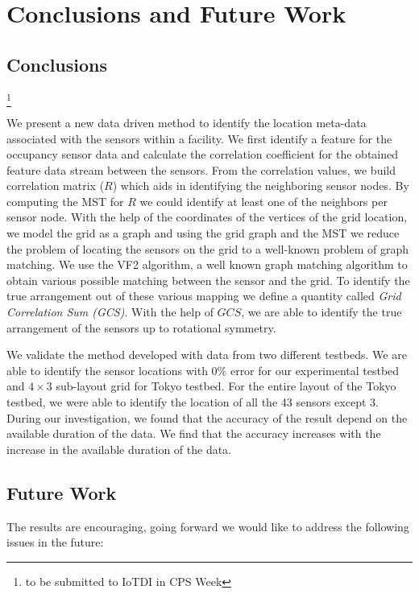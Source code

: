 \chapter{Conclusions and Future Work}
\label{chp:conclusionsandfuturework}
\newcommand\blfootnote[1]{%
  \begingroup
  \renewcommand\thefootnote{}\footnote{#1}%
  \addtocounter{footnote}{-1}%
  \endgroup
}

\section{Conclusions}

\blfootnote{to be submitted to IoTDI in CPS Week} We present a new data driven method to identify the location meta-data associated with the sensors within a facility. We first identify a feature for the occupancy sensor data and calculate the correlation coefficient for the obtained feature data stream between the sensors. From the correlation values, we build correlation matrix ($R$)  which aids in identifying the neighboring sensor nodes. By computing the MST for $R$ we could identify at least one of the neighbors per sensor node. With the help of the coordinates of the vertices of the grid location, we model the grid as a graph and using the grid graph and the MST we reduce the problem of locating the sensors on the grid to a well-known problem of graph matching. We use the VF2 algorithm, a well known graph matching algorithm to obtain various possible matching between the sensor and the grid. To identify the true arrangement out of these various mapping we define a quantity called \textit{Grid Correlation Sum (GCS)}. With the help of $GCS$, we are able to identify the true arrangement of the sensors up to rotational symmetry. 

We validate the method developed with data from two different testbeds. We are able to identify the sensor locations with 0\% error for our experimental testbed and $4\times3$ sub-layout grid for Tokyo testbed.
For the entire layout of the Tokyo testbed, we were able to identify the location of all the 43 sensors except 3.
During our investigation, we found  that the accuracy of the result depend on the available duration of the data.
We find that the accuracy increases with the increase in the available duration of the data.


\section{Future Work}
The results are encouraging, going forward we would like to address the following issues in the future:

